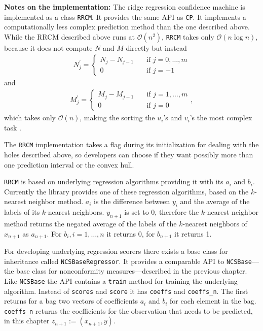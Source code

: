 \documentclass[twoside,11pt]{article}
\begin{document}
\noindent
\textbf{Notes on the implementation:}
The ridge regression confidence machine is implemented as
a class \texttt{RRCM}. It provides the same API as
\texttt{CP}. It implements a computationally less complex
prediction method than the one described above. While the
RRCM described above runs at $\mathcal{O}(n^2)$,
\texttt{RRCM} takes only $\mathcal{O}(n \log n)$, because it
does not compute $N$ and $M$ directly but instead
\begin{align*}
N_{j}^\prime =
  \begin{cases}
    N_j - N_{j-1} &\quad \text{if } j=0,\dots,m \\
    0             &\quad \text{if } j=-1
  \end{cases}
\end{align*}
and
\begin{align*}
M_{j}^\prime =
  \begin{cases}
    M_j - M_{j-1} &\quad \text{if } j=1,\dots,m \\
    0             &\quad \text{if } j=0
  \end{cases},
\end{align*}
which takes only $\mathcal{O}(n)$, making the sorting the
$u_i$'s and $v_i$'s the most complex task
\citep[see][Chapter 2.3]{alrw}.

The \texttt{RRCM} implementation takes a flag during
its initialization for dealing with the holes described
above, so developers can choose if they want possibly more
than one prediction interval or the convex hull.

\texttt{RRCM} is based on underlying regression algorithms
providing it with its $a_i$ and $b_i$. Currently the
library provides one of these regression algorithms, based
on the $k$-nearest neighbor method.
$a_i$ is the difference between $y_i$ and the average of
the labels of its $k$-nearest neighbors. $y_{n+1}$ is set
to 0, therefore the $k$-nearest neighbor method returns the
negated average of the labels of the $k$-nearest neighbors
of $x_{n+1}$ as $a_{n+1}$.
For $b_i, i=1,\dots,n$ it returns 0, for $b_{n+1}$ it
returns 1.

For developing underlying regression scorers there exists
a base class for inheritance called
\texttt{NCSBaseRegressor}.
It provides a comparable API to \texttt{NCSBase}---the
base class for nonconformity measures---described
in the previous chapter.
Like \texttt{NCSBase} the API contains a \texttt{train}
method for training the underlying algorithm.
Instead of \texttt{scores} and \texttt{score} it has
\texttt{coeffs} and \texttt{coeffs\_n}. The first returns
for a bag two vectors of coefficients $a_i$ and $b_i$ for
each element in the bag. \texttt{coeffs\_n} returns
the coefficients for the observation that needs to be
predicted, in this chapter $z_{n+1} := (x_{n+1},y)$.
\end{document}
